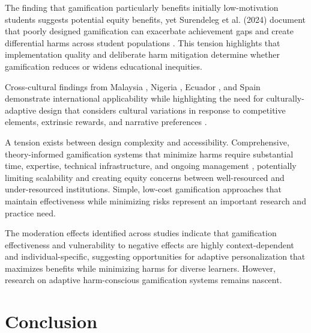 \documentclass[12pt,a4paper]{article}
\begin{document}
The finding that gamification particularly benefits initially low-motivation students \parencite{ojonuba2023,rodriguez2025} suggests potential equity benefits, yet Surendeleg et al. (2024) document that poorly designed gamification can exacerbate achievement gaps and create differential harms across student populations \parencite{surendeleg2024}. This tension highlights that implementation quality and deliberate harm mitigation determine whether gamification reduces or widens educational inequities.

Cross-cultural findings from Malaysia \parencite{dahri2024}, Nigeria \parencite{ojonuba2023}, Ecuador \parencite{sevilla2024}, and Spain \parencite{rodriguez2025} demonstrate international applicability while highlighting the need for culturally-adaptive design that considers cultural variations in response to competitive elements, extrinsic rewards, and narrative preferences \parencite{toda2022,dahri2024}.

A tension exists between design complexity and accessibility. Comprehensive, theory-informed gamification systems that minimize harms require substantial time, expertise, technical infrastructure, and ongoing management \parencite{rodriguez2025,wang2023,surendeleg2024}, potentially limiting scalability and creating equity concerns between well-resourced and under-resourced institutions. Simple, low-cost gamification approaches that maintain effectiveness while minimizing risks represent an important research and practice need.

The moderation effects identified across studies \parencite{wu2024,ojonuba2023,rodriguez2025,surendeleg2024} indicate that gamification effectiveness and vulnerability to negative effects are highly context-dependent and individual-specific, suggesting opportunities for adaptive personalization that maximizes benefits while minimizing harms for diverse learners. However, research on adaptive harm-conscious gamification systems remains nascent.



\section{Conclusion}
\end{document}
